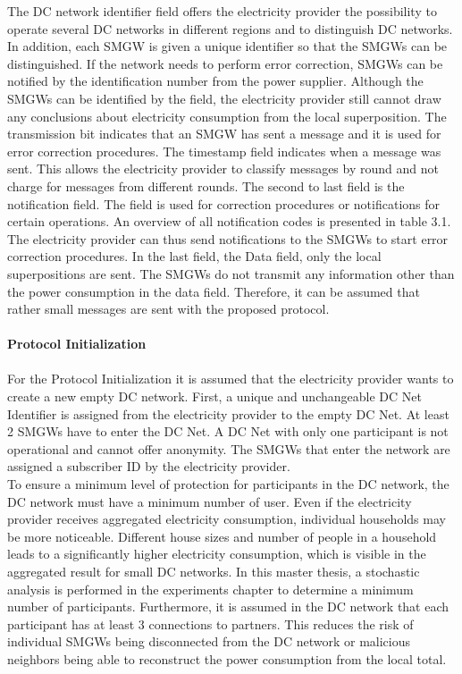 The DC network identifier field offers the electricity provider the possibility to operate several DC networks in different regions and to distinguish DC networks. In addition, each SMGW is given a unique identifier so that the SMGWs can be distinguished. If the network needs to perform error correction, SMGWs can be notified by the identification number from the power supplier. Although the SMGWs can be identified by the field, the electricity provider still cannot draw any conclusions about electricity consumption from the local superposition. The transmission bit indicates that an SMGW has sent a message and it is used for error correction procedures. The timestamp field indicates when a message was sent. This allows the electricity provider to classify messages by round and not charge for messages from different rounds. The second to last field is the notification field. The field is used for correction procedures or notifications for certain operations. An overview of all notification codes is presented in table 3.1. The electricity provider can thus send notifications to the SMGWs to start error correction procedures. In the last field, the Data field, only the local superpositions are sent. The SMGWs do not transmit any information other than the power consumption in the data field. Therefore, it can be assumed that rather small messages are sent with the proposed protocol.\\
\\
\textbf{Protocol Initialization}
\\
\\
For the Protocol Initialization it is assumed that the electricity provider wants to create a new empty DC network. First, a unique and unchangeable DC Net Identifier is assigned from the electricity provider to the empty DC Net. At least 2 SMGWs have to enter the DC Net. A DC Net with only one participant is not operational and cannot offer anonymity. 
The SMGWs that enter the network are assigned a subscriber ID by the electricity provider.\\
To ensure a minimum level of protection for participants in the DC network, the DC network must have a minimum number of user. Even if the electricity provider receives aggregated electricity consumption, individual households may be more noticeable. Different house sizes and number of people in a household leads to a significantly higher electricity consumption, which is visible in the aggregated result for small DC networks. In this master thesis, a stochastic analysis is performed in the experiments chapter to determine a minimum number of participants. Furthermore, it is assumed in the DC network that each participant has at least 3 connections to partners. This reduces the risk of individual SMGWs being disconnected from the DC network or malicious neighbors being able to reconstruct the power consumption from the local total.\\
